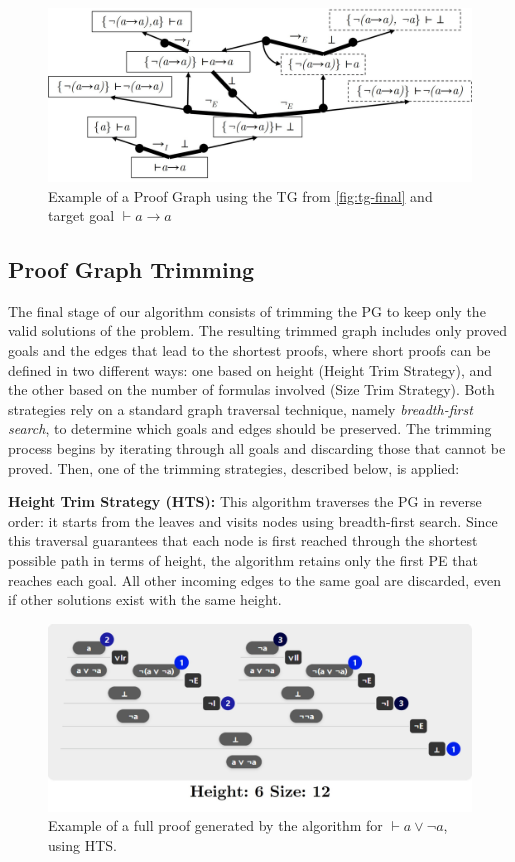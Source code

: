 \begin{figure}[t]
    \centering
    \includegraphics[width=0.8\linewidth]{resources/sg-gen.jpg}
    \caption{Example of a Proof Graph using the TG from \autoref{fig:tg-final} and target goal \(\vdash a \to a\)}
    \label{fig:st-ex}
\end{figure}

\subsection{Proof Graph Trimming}

The final stage of our algorithm consists of trimming the PG to keep only the valid solutions of the problem. The resulting trimmed graph includes only proved goals and the edges that lead to the shortest proofs, where short proofs can be defined in two different ways: one based on height (Height Trim Strategy), and the other based on the number of formulas involved (Size Trim Strategy). Both strategies rely on a standard graph traversal technique, namely \emph{breadth-first search}, to determine which goals and edges should be preserved. The trimming process begins by iterating through all goals and discarding those that cannot be proved. Then, one of the trimming strategies, described below, is applied:
\vspace{1em}

\textbf{Height Trim Strategy (HTS):} This algorithm traverses the PG in reverse order: it starts from the leaves and visits nodes using breadth-first search. Since this traversal guarantees that each node is first reached through the shortest possible path in terms of height, the algorithm retains only the first PE that reaches each goal. All other incoming edges to the same goal are discarded, even if other solutions exist with the same height.

\begin{figure}[t]
    \centering
    \includegraphics[width=0.6\linewidth]{resources/trim-height.jpg}
    \caption{Example of a full proof generated by the algorithm for \(\vdash a \vee \lnot a\), using HTS.}
    \label{fig:sg-trim-height}
\end{figure}

